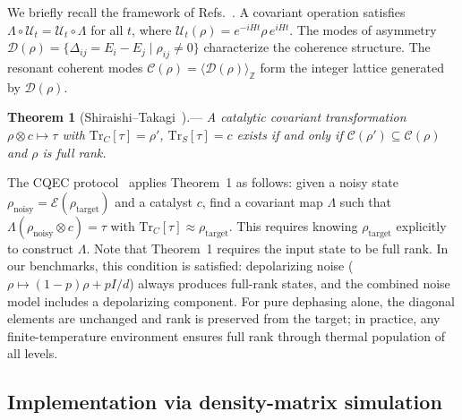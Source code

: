 \documentclass[prx,twocolumn,superscriptaddress,longbibliography,floatfix]{revtex4-2}
\newcommand{\CC}{\mathcal{C}}
\newcommand{\DD}{\mathcal{D}}
\newcommand{\EE}{\mathcal{E}}
\newcommand{\UU}{\mathcal{U}}
\newcommand{\tr}{\mathrm{Tr}}
\newcommand{\rhot}{\rho_\mathrm{target}}
\newcommand{\rhon}{\rho_\mathrm{noisy}}
\begin{document}
We briefly recall the framework of Refs.~\cite{Shiraishi2024,Wakaura2026unified}.
A covariant operation satisfies $\Lambda \circ \UU_t = \UU_t \circ \Lambda$ for all $t$, where $\UU_t(\rho) = e^{-iHt}\rho\,e^{iHt}$.
The modes of asymmetry $\DD(\rho) = \{\Delta_{ij} = E_i - E_j \mid \rho_{ij} \neq 0\}$ characterize the coherence structure.
The resonant coherent modes $\CC(\rho) = \langle \DD(\rho) \rangle_\mathbb{Z}$ form the integer lattice generated by $\DD(\rho)$.

\noindent\textbf{Theorem 1} (Shiraishi--Takagi~\cite{Shiraishi2024}).---\textit{%
A catalytic covariant transformation $\rho \otimes c \mapsto \tau$ with $\tr_C[\tau] = \rho'$, $\tr_S[\tau] = c$ exists if and only if $\CC(\rho') \subseteq \CC(\rho)$ and $\rho$ is full rank.}

The CQEC protocol~\cite{Wakaura2026unified} applies Theorem~1 as follows: given a noisy state $\rhon = \EE(\rhot)$ and a catalyst $c$, find a covariant map $\Lambda$ such that $\Lambda(\rhon \otimes c) = \tau$ with $\tr_C[\tau] \approx \rhot$.
This requires knowing $\rhot$ explicitly to construct $\Lambda$.
Note that Theorem~1 requires the input state to be full rank.
In our benchmarks, this condition is satisfied: depolarizing noise ($\rho \mapsto (1-p)\rho + pI/d$) always produces full-rank states, and the combined noise model includes a depolarizing component.
For pure dephasing alone, the diagonal elements are unchanged and rank is preserved from the target; in practice, any finite-temperature environment ensures full rank through thermal population of all levels.

\subsection{Implementation via density-matrix simulation}
\label{sec:implementation}
\end{document}
